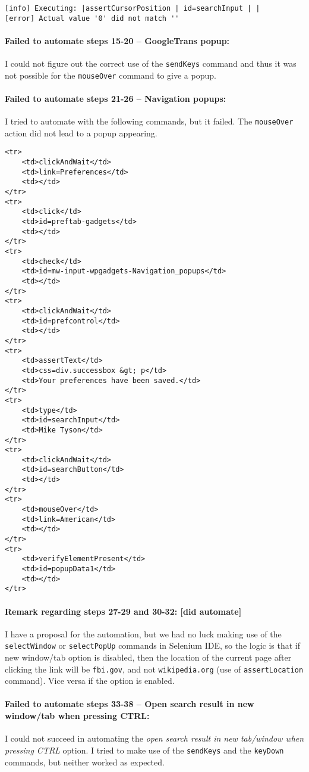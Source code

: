 \documentclass[a4paper,10pt]{article}
\begin{document}
\begin{verbatim}
[info] Executing: |assertCursorPosition | id=searchInput | |
[error] Actual value '0' did not match ''
\end{verbatim}

\paragraph*{Failed to automate steps 15-20 -- GoogleTrans popup:} I could not figure out the correct use of the \texttt{sendKeys} command and thus it was not 
possible for the \texttt{mouseOver} command to give a popup. 

\paragraph*{Failed to automate steps 21-26 -- Navigation popups:} I tried to automate with the following commands, but it failed. The \texttt{mouseOver} action did not lead to a 
popup appearing.

\begin{verbatim}
<tr>
	<td>clickAndWait</td>
	<td>link=Preferences</td>
	<td></td>
</tr>
<tr>
	<td>click</td>
	<td>id=preftab-gadgets</td>
	<td></td>
</tr>
<tr>
	<td>check</td>
	<td>id=mw-input-wpgadgets-Navigation_popups</td>
	<td></td>
</tr>
<tr>
	<td>clickAndWait</td>
	<td>id=prefcontrol</td>
	<td></td>
</tr>
<tr>
	<td>assertText</td>
	<td>css=div.successbox &gt; p</td>
	<td>Your preferences have been saved.</td>
</tr>
<tr>
	<td>type</td>
	<td>id=searchInput</td>
	<td>Mike Tyson</td>
</tr>
<tr>
	<td>clickAndWait</td>
	<td>id=searchButton</td>
	<td></td>
</tr>
<tr>
	<td>mouseOver</td>
	<td>link=American</td>
	<td></td>
</tr>
<tr>
	<td>verifyElementPresent</td>
	<td>id=popupData1</td>
	<td></td>
</tr>
\end{verbatim}


\paragraph{Remark regarding steps 27-29 and 30-32: [did automate]} I have a proposal for the automation, but we had no luck making use of the \texttt{selectWindow} or \texttt{selectPopUp} 
commands in Selenium IDE, so the logic is that if new window/tab option is disabled, then the location of the current page after clicking the link will be
\texttt{fbi.gov}, and not \texttt{wikipedia.org} (use of \texttt{assertLocation} command). Vice versa if the option is enabled.

\paragraph{Failed to automate steps 33-38 -- Open search result in new window/tab when pressing CTRL:} I could not succeed in automating the \textit{open search result in new tab/window when pressing CTRL} option. I tried to 
make use of the \texttt{sendKeys} and the \texttt{keyDown} commands, but neither worked as expected.
\end{document}
